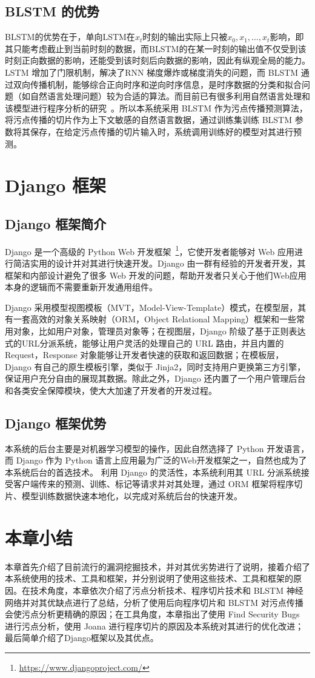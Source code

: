 \subsection{BLSTM 的优势}

BLSTM的优势在于，单向LSTM在$x_t$时刻的输出实际上只被$x_0, x_1, \dots, x_t$影响，即其只能考虑截止到当前时刻的数据，而BLSTM的在某一时刻的输出值不仅受到该时刻正向数据的影响，还能受到该时刻后向数据的影响，因此有纵观全局的能力。\\

LSTM 增加了门限机制，解决了RNN 梯度爆炸或梯度消失的问题，而 BLSTM 通过双向传播机制，能够综合正向时序和逆向时序信息，是时序数据的分类和拟合问题（如自然语言处理问题）较为合适的算法。而目前已有很多利用自然语言处理和该模型进行程序分析的研究~\cite{naturalSoftware,lstm:recognize,lstm:repo,vuldeepecker,Koc2017,Koc2019}。所以本系统采用 BLSTM 作为污点传播预测算法，将污点传播的切片作为上下文敏感的自然语言数据，通过训练集训练 BLSTM 参数将其保存，在给定污点传播的切片输入时，系统调用训练好的模型对其进行预测。

\section{Django 框架}
\subsection{Django 框架简介}
Django 是一个高级的 Python Web 开发框架~\footnote{\url{https://www.djangoproject.com/}}，它使开发者能够对 Web 应用进行简洁实用的设计并对其进行快速开发。Django 由一群有经验的开发者开发，其框架和内部设计避免了很多 Web 开发的问题，帮助开发者只关心于他们Web应用本身的逻辑而不需要重新开发通用组件。

Django 采用模型视图模板（MVT，Model-View-Template）模式，在模型层，其有一套高效的对象关系映射（ORM，Object Relational Mapping）框架和一些常用对象，比如用户对象，管理员对象等；在视图层，Django 阶级了基于正则表达式的URL分派系统，能够让用户灵活的处理自己的 URL 路由，并且内置的 Request，Response 对象能够让开发者快速的获取和返回数据；在模板层，Django 有自己的原生模板引擎，类似于 Jinja2，同时支持用户更换第三方引擎，保证用户充分自由的展现其数据。除此之外，Django 还内置了一个用户管理后台和各类安全保障模块，使大大加速了开发者的开发过程。\\

\subsection{Django 框架优势}
本系统的后台主要是对机器学习模型的操作，因此自然选择了 Python 开发语言，而 Django 作为 Python 语言上应用最为广泛的Web开发框架之一，自然也成为了本系统后台的首选技术。
利用 Django 的灵活性，本系统利用其 URL 分派系统接受客户端传来的预测、训练、标记等请求并对其处理，通过 ORM 框架将程序切片、模型训练数据快速本地化，以完成对系统后台的快速开发。

\section{本章小结}
本章首先介绍了目前流行的漏洞挖掘技术，并对其优劣势进行了说明，接着介绍了本系统使用的技术、工具和框架，并分别说明了使用这些技术、工具和框架的原因。在技术角度，本章依次介绍了污点分析技术、程序切片技术和 BLSTM 神经网络并对其优缺点进行了总结，分析了使用后向程序切片和 BLSTM 对污点传播会使污点分析更精确的原因；在工具角度，本章指出了使用 Find Security Bugs 进行污点分析，使用 Joana 进行程序切片的原因及本系统对其进行的优化改进；最后简单介绍了Django框架以及其优点。
